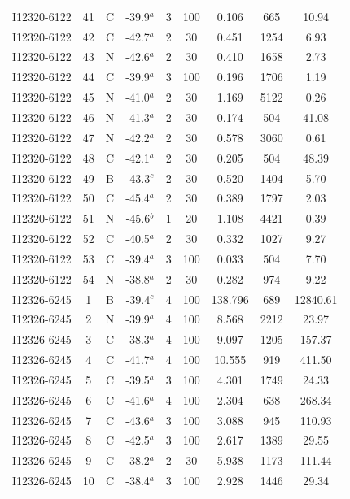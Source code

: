 \begin{table}
\begin{tabular}{ccccccccc}
I12320-6122 & 41 & C & -39.9$^{a}$ & 3 & 100 & 0.106 & 665 & 10.94 \\
I12320-6122 & 42 & C & -42.7$^{a}$ & 2 & 30 & 0.451 & 1254 & 6.93 \\
I12320-6122 & 43 & N & -42.6$^{a}$ & 2 & 30 & 0.410 & 1658 & 2.73 \\
I12320-6122 & 44 & C & -39.9$^{a}$ & 3 & 100 & 0.196 & 1706 & 1.19 \\
I12320-6122 & 45 & N & -41.0$^{a}$ & 2 & 30 & 1.169 & 5122 & 0.26 \\
I12320-6122 & 46 & N & -41.3$^{a}$ & 2 & 30 & 0.174 & 504 & 41.08 \\
I12320-6122 & 47 & N & -42.2$^{a}$ & 2 & 30 & 0.578 & 3060 & 0.61 \\
I12320-6122 & 48 & C & -42.1$^{a}$ & 2 & 30 & 0.205 & 504 & 48.39 \\
I12320-6122 & 49 & B & -43.3$^{c}$ & 2 & 30 & 0.520 & 1404 & 5.70 \\
I12320-6122 & 50 & C & -45.4$^{a}$ & 2 & 30 & 0.389 & 1797 & 2.03 \\
I12320-6122 & 51 & N & -45.6$^{b}$ & 1 & 20 & 1.108 & 4421 & 0.39 \\
I12320-6122 & 52 & C & -40.5$^{a}$ & 2 & 30 & 0.332 & 1027 & 9.27 \\
I12320-6122 & 53 & C & -39.4$^{a}$ & 3 & 100 & 0.033 & 504 & 7.70 \\
I12320-6122 & 54 & N & -38.8$^{a}$ & 2 & 30 & 0.282 & 974 & 9.22 \\
I12326-6245 & 1 & B & -39.4$^{c}$ & 4 & 100 & 138.796 & 689 & 12840.61 \\
I12326-6245 & 2 & N & -39.9$^{a}$ & 4 & 100 & 8.568 & 2212 & 23.97 \\
I12326-6245 & 3 & C & -38.3$^{a}$ & 4 & 100 & 9.097 & 1205 & 157.37 \\
I12326-6245 & 4 & C & -41.7$^{a}$ & 4 & 100 & 10.555 & 919 & 411.50 \\
I12326-6245 & 5 & C & -39.5$^{a}$ & 3 & 100 & 4.301 & 1749 & 24.33 \\
I12326-6245 & 6 & C & -41.6$^{a}$ & 4 & 100 & 2.304 & 638 & 268.34 \\
I12326-6245 & 7 & C & -43.6$^{a}$ & 3 & 100 & 3.088 & 945 & 110.93 \\
I12326-6245 & 8 & C & -42.5$^{a}$ & 3 & 100 & 2.617 & 1389 & 29.55 \\
I12326-6245 & 9 & C & -38.2$^{a}$ & 2 & 30 & 5.938 & 1173 & 111.44 \\
I12326-6245 & 10 & C & -38.4$^{a}$ & 3 & 100 & 2.928 & 1446 & 29.34 \\

\end{tabular}
\end{table}
